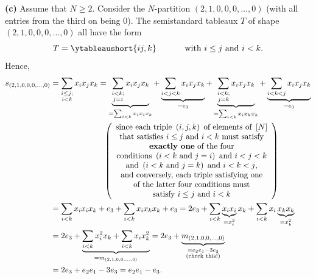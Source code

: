 \begin{example}
\textbf{(c)} Assume that $N\geq2$. Consider the $N$-partition $\left(
2,1,0,0,0,\ldots,0\right)  $ (with all entries from the third on being $0$).
The semistandard tableaux $T$ of shape $\left(  2,1,0,0,0,\ldots,0\right)  $
all have the form%
\[
T=\ytableaushort{ij,k}\ \ \ \ \ \ \ \ \ \ \text{with }i\leq j\text{ and }i<k.
\]
Hence,%
\begin{align*}
s_{\left(  2,1,0,0,0,\ldots,0\right)  }  &  =\sum_{\substack{i\leq
j;\\i<k}}x_{i}x_{j}x_{k}=\underbrace{\sum_{\substack{i<k;\\j=i}}x_{i}%
x_{j}x_{k}}_{=\sum_{i<k}x_{i}x_{i}x_{k}}+\underbrace{\sum_{i<j<k}x_{i}%
x_{j}x_{k}}_{=e_{3}}+\underbrace{\sum_{\substack{i<k;\\j=k}}x_{i}x_{j}x_{k}%
}_{=\sum_{i<k}x_{i}x_{k}x_{k}}+\underbrace{\sum_{i<k<j}x_{i}x_{j}x_{k}%
}_{=e_{3}}\\
&  \ \ \ \ \ \ \ \ \ \ \ \ \ \ \ \ \ \ \ \ \left(
\begin{array}
[c]{c}%
\text{since each triple }\left(  i,j,k\right)  \text{ of elements of }\left[
N\right] \\
\text{that satisfies }i\leq j\text{ and }i<k\text{ must satisfy}\\
\text{\textbf{exactly one} of the four}\\
\text{conditions }\left(  i<k\text{ and }j=i\right)  \text{ and }i<j<k\\
\text{and }\left(  i<k\text{ and }j=k\right)  \text{ and }i<k<j\text{,}\\
\text{and conversely, each triple satisfying one}\\
\text{of the latter four conditions must}\\
\text{satisfy }i\leq j\text{ and }i<k
\end{array}
\right) \\
&  =\sum_{i<k}x_{i}x_{i}x_{k}+e_{3}+\sum_{i<k}x_{i}x_{k}x_{k}+e_{3}%
=2e_{3}+\sum_{i<k}\underbrace{x_{i}x_{i}}_{=x_{i}^{2}}x_{k}+\sum_{i<k}%
x_{i}\underbrace{x_{k}x_{k}}_{=x_{k}^{2}}\\
&  =2e_{3}+\underbrace{\sum_{i<k}x_{i}^{2}x_{k}+\sum_{i<k}x_{i}x_{k}^{2}%
}_{=m_{\left(  2,1,0,0,\ldots,0\right)  }}=2e_{3}+\underbrace{m_{\left(
2,1,0,0,\ldots,0\right)  }}_{\substack{=e_{2}e_{1}-3e_{3}\\\text{(check
this!)}}}\\
&  =2e_{3}+e_{2}e_{1}-3e_{3}=e_{2}e_{1}-e_{3}.
\end{align*}

\end{example}

